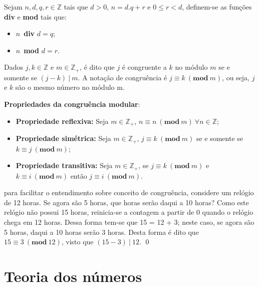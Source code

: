 Sejam $n,d,q,r \in \mathbb{Z}$ tais que $d > 0$, $n = d.q + r$ e $0 \leq r < d$, definem-se as funções \textbf{div} e \textbf{mod} tais que:

\begin{itemize}
	\item $n$\ \textbf{div} $d = q$;
	\item $n$\ \textbf{mod} $d = r$.
\end{itemize}

\begin{definition}
Dados $j, k \in \mathbb{Z}$ e $m \in \mathbb{Z}_{+}$, é dito que $j$ é congruente a $k$ no módulo $m$ se e somente se $(j - k) \ |\  m$. A notação de congruência é $j \equiv k\ (\textbf{mod}\ m)$, ou seja, $j$ e $k$ são o mesmo número no módulo m.
\end{definition}

    \noindent
    \textbf{Propriedades da congruência modular}:
    \begin{itemize}
         \item \textbf{Propriedade reflexiva:} Seja $m \in \mathbb{Z}_{+}$, $n \equiv n\: (\textbf{mod}\: m)\: \forall n \in \mathbb{Z}$;
    	\item \textbf{Propriedade simétrica:} Seja $m \in \mathbb{Z}_{+}$, $j \equiv k\: (\textbf{mod}\: m)$ se e somente se $k \equiv j\: (\textbf{mod}\: m)$;
    	\item \textbf{Propriedade transitiva:} Seja $m \in \mathbb{Z}_{+}$, se $j \equiv k\: (\textbf{mod}\: m)$ e $k \equiv i\: (\textbf{mod}\: m)$ então $j \equiv i\: (\textbf{mod}\: m)$.
    \end{itemize}
    
    \begin{exemplo}
    para facilitar o entendimento sobre conceito de congruência, considere um relógio de 12 horas. Se agora são 5 horas, que horas serão daqui a 10 horas? Como este relógio não possui 15 horas, reinicia-se a contagem a partir de 0 quando o relógio chega em 12 horas. Dessa forma tem-se que 15 = 12 + 3; neste caso, se agora são 5 horas, daqui a 10 horas serão 3 horas. Desta forma é dito que $15 \equiv 3\ (\textbf{mod}\ 12)$, visto que $(15 - 3)\ |\ 12$.
    \qed
    \end{exemplo}

\pagebreak
\section{Teoria dos números}

